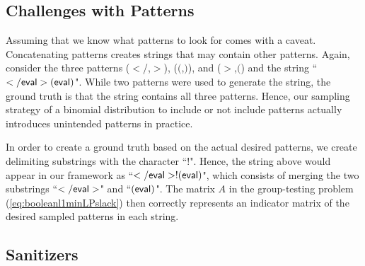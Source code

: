 \subsection{Challenges with Patterns}

Assuming that we know what patterns to look for comes with a caveat. Concatenating patterns creates strings that may contain other patterns. Again, consider the three patterns ($<$/,$>$), ($($,$)$), and ($>$,$($) and the string  ``$\sf{</eval>(eval)}$". While two patterns were used to generate the string, the ground truth is that the string contains all three patterns. Hence, our sampling strategy of a binomial distribution to include or not include patterns actually introduces unintended patterns in practice. 

In order to create a ground truth based on the actual desired patterns, we create delimiting substrings with the character ``$!$".  Hence, the string above would appear in our framework as 
``$\sf{</eval>!(eval)}$", which consists of merging the two substrings ``$\sf{</eval>}$" and ``$\sf{(eval)}$". The matrix $A$ in the group-testing problem (\ref{eq:booleanl1minLPslack}) then correctly represents an indicator matrix of the desired sampled patterns in each string.

\subsection{Sanitizers} \label{ss:sanitizers}


